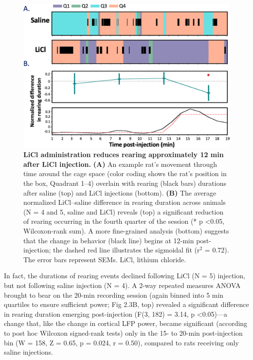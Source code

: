 \begin{refsection}
\begin{figure}
\includegraphics[width=\linewidth]{stone_2022_figs/journal.pbio.3001537.g003.png} 
\caption{\textbf{LiCl administration reduces rearing approximately 12 min after LiCl injection.} \textbf{(A)} An example rat’s movement through time around the cage space (color coding shows the rat’s position in the box, Quadrant 1–4) overlain with rearing (black bars) durations after saline (top) and LiCl injections (bottom). \textbf{(B)} The average normalized LiCl–saline difference in rearing duration across animals (N = 4 and 5, saline and LiCl) reveals (top) a significant reduction of rearing occurring in the fourth quarter of the session (* p \textless 0.05, Wilcoxon-rank sum). A more fine-grained analysis (bottom) suggests that the change in behavior (black line) begins at 12-min post-injection; the dashed red line illustrates the sigmoidal fit (r$^2$ = 0.72). The error bars represent SEMs. LiCl, lithium chloride.
}
\label{fig:wrapfig}
\end{figure}



In fact, the durations of rearing events declined following LiCl (N = 5) injection, but not following saline injection (N = 4). A 2-way repeated measures ANOVA brought to bear on the 20-min recording session (again binned into 5 min quartiles to ensure sufficient power; Fig 2.3B, top) revealed a significant difference in rearing duration emerging post-injection (F(3, 182) = 3.14, p \textless 0.05)—a change that, like the change in cortical LFP power, became significant (according to post hoc Wilcoxon signed-rank tests) only in the 15- to 20-min post-injection bin (W = 158, Z = 0.65, p = 0.024, r = 0.50), compared to rats receiving only saline injections.


\end{refsection}
